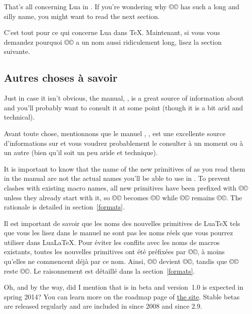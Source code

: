 \documentclass{lltxdoc}
\begin{document}
\medskip

That's all concerning Lua in \tex. If you're wondering why
©\luatexluaescapestring© has such a long and silly name, you might want to
read the next section.

C'est tout pour ce qui concerne Lua dans TeX. Maintenant, si vous vous demandez pourquoi ©\luatexluaescapestring© a un nom aussi ridiculement long, lisez la section suivante.

\subsection{Autres choses à savoir}\label{things}

Just in case it isn't obvious, the \luatex manual, , is
a great source of information about \luatex and you'll probably want to
consult it at some point (though it is a bit arid and technical).

Avant toute chose, mentionnons que le manuel \luatex, , est une excellente source d'informations sur \luatex et vous voudrez probablement le consulter à un moment ou à un autre (bien qu'il soit un peu aride et technique).

It is important to know that the name of the new primitives of \luatex as you
read them in the manual are not the actual names you'll be able to use in
\lualatex. To prevent clashes with existing macro names, all new primitives
have been prefixed with ©\luatex© unless they already start with it, so
©\luaescapestring© becomes ©\luatexluaescapetring© while ©\luatexversion©
remains ©\luatexversion©. The rationale is detailed in section~\ref{formats}.

Il est important de savoir que les noms des nouvelles primitives de LuaTeX tels que vous les lisez dans le manuel ne sont pas les noms réels que vous pourrez utiliser dans LuaLaTeX. Pour éviter les conflits avec les noms de macros existants, toutes les nouvelles primitives ont été préfixées par ©\luatex©, à moins qu'elles ne commencent déjà par ce nom. Ainsi, ©\luaescapestring© devient ©\luatexluaescapetring©, tandis que ©\luatexversion© reste ©\luatexversion©. Le raisonnement est détaillé dans la section~\ref{formats}.

\medskip

Oh, and by the way, did I mention that \luatex is in beta and version~1.0 is
expected in spring 2014? You can learn more on the roadmap page of
\href{http://luatex.org/}{the \luatex site}. Stable betas are released
regularly and are included in \texlive since 2008 and \miktex since 2.9.
\end{document}
